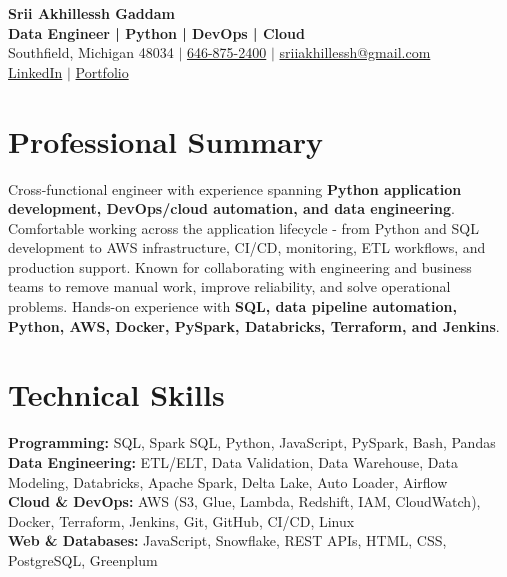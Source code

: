 \documentclass[letterpaper,10pt]{article}
\begin{document}
\fontsize{9.35pt}{10.45pt}\selectfont

\begin{center}
    {\LARGE \textbf{Srii Akhillessh Gaddam}} \\[-1pt]
    \textbf{Data Engineer | Python | DevOps | Cloud} \\[2pt]
    Southfield, Michigan 48034 $|$
    \href{tel:6468752400}{646-875-2400} $|$
    \href{mailto:sriiakhillessh@gmail.com}{sriiakhillessh@gmail.com} \\[1pt]
    \href{https://www.linkedin.com/in/srii-akhiilessh-gaddam-b48668191/}{LinkedIn} $|$
    \href{https://sriiakhillesshg.github.io/portfolio/}{Portfolio}
\end{center}
\vspace{-8pt}

\section{Professional Summary}
\small{Cross-functional engineer with experience spanning \textbf{Python application development, DevOps/cloud automation, and data engineering}. Comfortable working across the application lifecycle - from Python and SQL development to AWS infrastructure, CI/CD, monitoring, ETL workflows, and production support. Known for collaborating with engineering and business teams to remove manual work, improve reliability, and solve operational problems. Hands-on experience with \textbf{SQL, data pipeline automation, Python, AWS, Docker, PySpark, Databricks, Terraform, and Jenkins}.}

\section{Technical Skills}
\small{
\textbf{Programming:} SQL, Spark SQL, Python, JavaScript, PySpark, Bash, Pandas \\
\textbf{Data Engineering:} ETL/ELT, Data Validation, Data Warehouse, Data Modeling, Databricks, Apache Spark, Delta Lake, Auto Loader, Airflow \\
\textbf{Cloud \& DevOps:} AWS (S3, Glue, Lambda, Redshift, IAM, CloudWatch), Docker, Terraform, Jenkins, Git, GitHub, CI/CD, Linux \\
\textbf{Web \& Databases:} JavaScript, Snowflake, REST APIs, HTML, CSS, PostgreSQL, Greenplum
}
\end{document}
